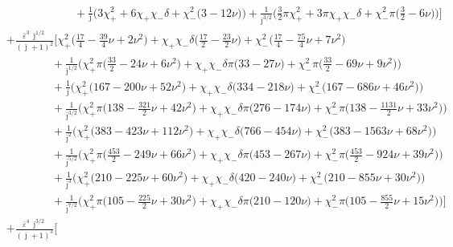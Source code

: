 \documentclass[prd,superscriptaddress,preprintnumbers,tightenlines,nofootinbib, eqsecnum]{revtex4-2}
\newcommand{\nn}{\nonumber}
\begin{document}
\begin{align}
&\qquad\qquad\qquad + \frac{1}{\bar{\jmath}}\Bigg(3\chi_{+}^{2} + 6\chi_{+}\chi_{-}\delta + \chi_{-}^{2}\bigg(3 - 12 \nu\bigg)\Bigg) + \frac{1}{\bar{\jmath}^{3/2}}\Bigg(\frac{3}{2}\pi\chi_{+}^{2} + 3 \pi\chi_{+}\chi_{-}\delta + \chi_{-}^{2}\pi\bigg(\frac{3}{2} - 6 \nu\bigg)\Bigg)\Bigg] \nn \\
&+ \frac{\bar{\varepsilon}^{3}\,\bar{\jmath}^{1/2}}{(\bar{\jmath}+1)^{2}}\Bigg[
\chi_{+}^{2}\bigg(\frac{17}{4} - \frac{39}{4}\nu + 2 \nu^{2}\bigg) + \chi_{+}\chi_{-}\delta\bigg(\frac{17}{2} - \frac{23}{2}\nu\bigg) + \chi_{-}^{2}\bigg(\frac{17}{4} - \frac{75}{4}\nu + 7 \nu^{2}\bigg) \nn \\
&\qquad\qquad + \frac{1}{\bar{\jmath}^{1/2}}\Bigg(\chi_{+}^{2}\pi\bigg(\frac{33}{2} - 24 \nu + 6 \nu^{2}\bigg) + \chi_{+}\chi_{-}\delta\pi\bigg(33 - 27 \nu\bigg) + \chi_{-}^{2}\pi\bigg(\frac{33}{2} - 69 \nu + 9 \nu^{2}\bigg)\Bigg) \nn \\
&\qquad\qquad + \frac{1}{\bar{\jmath}}\Bigg(\chi_{+}^{2}\bigg(167 - 200 \nu + 52 \nu^{2}\bigg) + \chi_{+}\chi_{-}\delta\bigg(334 - 218 \nu\bigg) + \chi_{-}^{2}\bigg(167 - 686 \nu + 46 \nu^{2}\bigg)\Bigg) \nn \\
&\qquad\qquad + \frac{1}{\bar{\jmath}^{3/2}}\Bigg(\chi_{+}^{2}\pi\bigg(138 - \frac{321}{2}\nu + 42 \nu^{2}\bigg) + \chi_{+}\chi_{-}\delta\pi\bigg(276 - 174 \nu\bigg) + \chi_{-}^{2}\pi\bigg(138 - \frac{1131}{2}\nu + 33 \nu^{2}\bigg)\Bigg) \nn \\
&\qquad\qquad + \frac{1}{\bar{\jmath}^{2}}\Bigg(\chi_{+}^{2}\bigg(383 - 423 \nu + 112 \nu^{2}\bigg) + \chi_{+}\chi_{-}\delta\bigg(766 - 454 \nu\bigg) + \chi_{-}^{2}\bigg(383 - 1563 \nu + 68 \nu^{2}\bigg)\Bigg) \nn \\
&\qquad\qquad + \frac{1}{\bar{\jmath}^{5/2}}\Bigg(\chi_{+}^{2}\pi\bigg(\frac{453}{2} - 249 \nu + 66 \nu^{2}\bigg) + \chi_{+}\chi_{-}\delta\pi\bigg(453 - 267 \nu\bigg) + \chi_{-}^{2}\pi\bigg(\frac{453}{2} - 924 \nu + 39 \nu^{2}\bigg)\Bigg) \nn \\
&\qquad\qquad + \frac{1}{\bar{\jmath}^{3}}\Bigg(\chi_{+}^{2}\bigg(210 - 225 \nu + 60 \nu^{2}\bigg) + \chi_{+}\chi_{-}\delta\bigg(420 - 240 \nu\bigg) + \chi_{-}^{2}\bigg(210 - 855 \nu + 30 \nu^{2}\bigg)\Bigg) \nn \\
&\qquad\qquad + \frac{1}{\bar{\jmath}^{7/2}}\Bigg(\chi_{+}^{2}\pi\bigg(105 - \frac{225}{2}\nu + 30 \nu^{2}\bigg) + \chi_{+}\chi_{-}\delta\pi\bigg(210 - 120 \nu\bigg) + \chi_{-}^{2}\pi\bigg(105 - \frac{855}{2}\nu + 15 \nu^{2}\bigg)\Bigg)\Bigg] \nn \\
&+ \frac{\bar{\varepsilon}^{4}\,\bar{\jmath}^{3/2}}{(\bar{\jmath}+1)^{3}}\Bigg[

\end{align}
\end{document}
